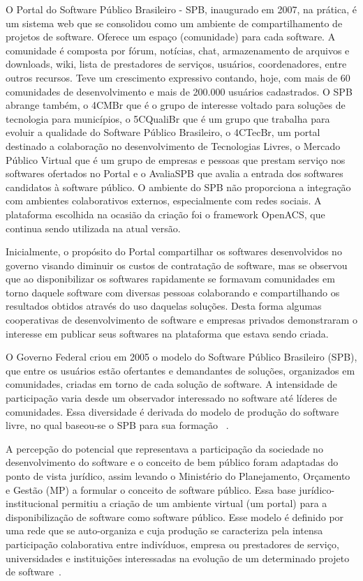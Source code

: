 O Portal do Software Público Brasileiro - SPB, inaugurado em 2007, na prática, é um sistema
web que se consolidou como um ambiente de compartilhamento de projetos de software. Oferece um
espaço (comunidade) para cada software. A comunidade é composta por fórum, notícias, chat, 
armazenamento de arquivos e downloads, wiki, lista de prestadores de serviços, usuários, coordenadores,
entre outros recursos. Teve um crescimento expressivo contando, hoje, com mais de 60 comunidades
de desenvolvimento e mais de 200.000 usuários cadastrados. O SPB abrange também, o 4CMBr que
é o grupo de interesse voltado para soluções de tecnologia para municípios, o 5CQualiBr que é um
grupo que trabalha para evoluir a qualidade do Software Público Brasileiro, o 4CTecBr, um portal
destinado a colaboração no desenvolvimento de Tecnologias Livres, o Mercado Público Virtual que
é um grupo de empresas e pessoas que prestam serviço nos softwares ofertados no Portal e o 
AvaliaSPB que avalia a entrada dos softwares candidatos à software público. O ambiente do SPB não
proporciona a integração com ambientes colaborativos externos, especialmente com redes sociais. A
plataforma escolhida na ocasião da criação foi o framework OpenACS, que continua sendo utilizada
na atual versão.

Inicialmente, o propósito do Portal compartilhar os softwares desenvolvidos
no governo visando diminuir os custos de contratação de software, mas se observou
que ao disponibilizar os softwares rapidamente se formavam comunidades em torno 
daquele software com diversas pessoas colaborando e compartilhando os resultados
obtidos através do uso daquelas soluções. Desta forma algumas cooperativas de 
desenvolvimento de software e empresas privados demonstraram o interesse em
publicar seus softwares na plataforma que estava sendo criada.

O Governo Federal criou em 2005 o modelo do Software
Público Brasileiro (SPB), que entre os usuários estão ofertantes e demandantes de soluções, 
organizados em comunidades, criadas em torno de cada solução de software. A intensidade de participação
varia desde um observador interessado no software até líderes de comunidades. Essa diversidade é
derivada do modelo de produção do software livre, no qual baseou-se o SPB para sua formação
~\cite{alves2009software}. 

A percepção do potencial que representava a participação da sociedade no desenvolvimento do software
e o conceito de bem público foram adaptadas do ponto de vista jurídico, assim levando o Ministério
do Planejamento, Orçamento e Gestão (MP) a formular o conceito de software público. Essa base
jurídico-institucional permitiu a criação de um ambiente virtual (um portal) para a disponibilização
de software como software público. Esse modelo é definido por uma rede que se auto-organiza e cuja
produção se caracteriza pela intensa participação colaborativa entre indivíduos, empresa ou 
prestadores de serviço, universidades e instituições interessadas na evolução de um determinado projeto
de software~\cite{alves2009software}.

